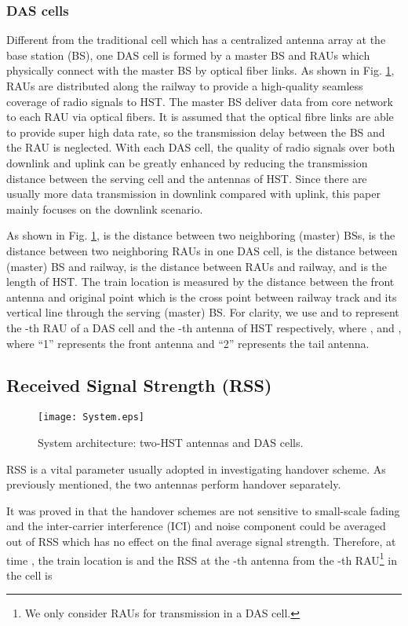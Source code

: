 \documentclass[a4paper,twocolumn,10pt]{IEEEtran}
\newcommand{\picspace}{{\vspace{-0.1 in}}}
\begin{document}
\subsubsection{DAS cells} Different from the traditional cell which has a centralized antenna array at the base station (BS), one DAS cell is formed by a master BS and  RAUs which physically connect with the master BS by optical fiber links. As shown in Fig. \ref{system}, RAUs are distributed along the railway to provide a high-quality seamless coverage of radio signals to HST. The master BS deliver data from core network to each RAU via optical fibers. It is assumed that the optical fibre links are able to provide super high data rate, so the transmission delay between the BS and the RAU is neglected. With each DAS cell, the quality of radio signals over both downlink and uplink can be greatly enhanced by reducing the transmission distance between the serving cell and the antennas of HST. Since there are usually more data transmission in downlink compared with uplink, this paper mainly focuses on the downlink scenario.

 As shown in Fig. \ref{system},  is the distance between two neighboring (master) BSs,  is the distance between two neighboring RAUs in one DAS cell,  is the distance between (master) BS and railway,  is the distance between RAUs and railway, and  is the length of HST. The train location  is measured by the distance between the front antenna and original point which is the cross point between railway track and its vertical line through the serving (master) BS. For clarity, we use  and  to represent the -th RAU of a DAS cell and the -th antenna of HST respectively, where , and , where ``1'' represents the front antenna and ``2'' represents the tail antenna.

\subsection{Received Signal Strength (RSS)}

\begin{figure}
\centering
\texttt{[image: System.eps]}
\caption{System architecture: two-HST antennas and DAS cells.}
\label{system}\picspace
\end{figure}


RSS is a vital parameter usually adopted in investigating handover scheme. As previously mentioned, the two antennas perform handover separately.

It was proved in \cite{Seamless} that the handover schemes are not sensitive to small-scale fading and the inter-carrier interference (ICI) and noise component could be averaged out of RSS which has no effect on the final average signal strength.  Therefore, at time , the train location  is  and the RSS at the -th antenna from the -th RAU\footnote{We only consider RAUs for transmission in a DAS cell.} in the cell  is
\end{document}
